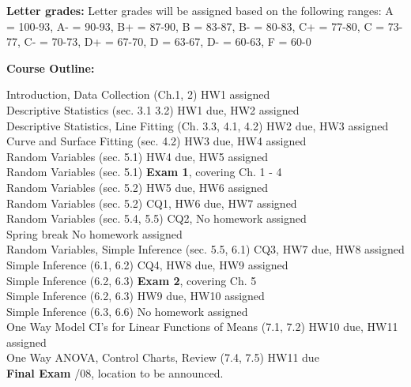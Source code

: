 \documentclass[12pt]{article}\usepackage[]{graphicx}\usepackage[]{color}
\begin{document}
\begin{center} 
\begin{minipage}{6.5in}
\begin{flushleft}
\textbf{Letter grades:} 
Letter grades will be assigned based on the following ranges: A = 100-93, A- = 90-93, B+ = 87-90, B = 83-87, B- = 80-83, C+ = 77-80, C = 73-77, C- = 70-73, D+ = 67-70, D = 63-67, D- = 60-63, F = 60-0
\end{flushleft}
\end{minipage}
\end{center}

\noindent\textbf{Course Outline:} 
\begin{center} \begin{minipage}{6.5in}
\begin{flushleft}
Introduction, Data Collection (Ch.1, 2) \dotfill HW1 assigned\\
Descriptive Statistics (sec. 3.1 3.2)  \dotfill HW1 due, HW2 assigned\\
Descriptive Statistics, Line Fitting  (Ch. 3.3, 4.1, 4.2) \dotfill HW2 due, HW3 assigned\\
Curve and Surface Fitting (sec. 4.2) \dotfill HW3 due, HW4 assigned \\
Random Variables (sec. 5.1) \dotfill HW4 due, HW5 assigned \\
Random Variables (sec. 5.1) \dotfill \textbf{Exam 1}, covering Ch. 1 - 4 \\
Random Variables (sec. 5.2) \dotfill HW5 due, HW6 assigned  \\
Random Variables (sec. 5.2) \dotfill CQ1, HW6 due, HW7 assigned  \\
Random Variables (sec. 5.4, 5.5) \dotfill CQ2, No homework assigned\\
Spring break \dotfill No homework assigned \\
Random Variables, Simple Inference (sec. 5.5, 6.1) \dotfill CQ3, HW7 due, HW8 assigned \\
Simple Inference (6.1, 6.2) \dotfill CQ4, HW8 due, HW9 assigned  \\
Simple Inference (6.2, 6.3) \dotfill \textbf{Exam 2}, covering Ch. 5 \\
Simple Inference (6.2, 6.3) \dotfill HW9 due, HW10 assigned  \\
Simple Inference (6.3, 6.6) \dotfill No homework assigned\\
One Way Model CI's for Linear Functions of Means (7.1, 7.2) \dotfill HW10 due, HW11 assigned  \\
One Way ANOVA, Control Charts, Review (7.4, 7.5) \dotfill HW11 due \\
\textbf{Final Exam} /08, location to be announced.
\end{flushleft}
\end{minipage}
\end{center}
\end{document}
